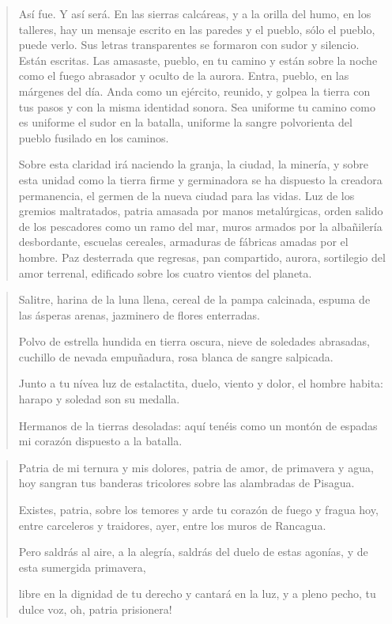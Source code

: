 \documentclass[12pt]{article}
\begin{document}
\clearpage
{}
\begin{verse}
Así fue. Y así será. En las sierras  
calcáreas, y a la orilla  
del humo, en los talleres,  
hay un mensaje escrito en las paredes  
y el pueblo, sólo el pueblo, puede verlo.  
Sus letras transparentes se formaron  
con sudor y silencio. Están escritas.  
Las amasaste, pueblo, en tu camino  
y están sobre la noche como el fuego  
abrasador y oculto de la aurora.  
Entra, pueblo, en las márgenes del día.  
Anda como un ejército, reunido,  
y golpea la tierra con tus pasos  
y con la misma identidad sonora.  
Sea uniforme tu camino como  
es uniforme el sudor en la batalla,  
uniforme la sangre polvorienta  
del pueblo fusilado en los caminos.  
	
Sobre esta claridad irá naciendo  
la granja, la ciudad, la minería,  
y sobre esta unidad como la tierra  
firme y germinadora se ha dispuesto  
la creadora permanencia, el germen  
de la nueva ciudad para las vidas.  
Luz de los gremios maltratados, patria  
amasada por manos metalúrgicas,  
orden salido de los pescadores  
como un ramo del mar, muros armados  
por la albañilería desbordante,  
escuelas cereales, armaduras  
de fábricas amadas por el hombre.  
Paz desterrada que regresas, pan  
compartido, aurora, sortilegio  
del amor terrenal, edificado  
sobre los cuatro vientos del planeta.  

\end{verse}

\clearpage
{}
\begin{verse}
Salitre, harina de la luna llena,  
cereal de la pampa calcinada,  
espuma de las ásperas arenas,  
jazminero de flores enterradas.  
	
Polvo de estrella hundida en tierra oscura,  
nieve de soledades abrasadas,  
cuchillo de nevada empuñadura,  
rosa blanca de sangre salpicada.  
	
Junto a tu nívea luz de estalactita,  
duelo, viento y dolor, el hombre habita:  
harapo y soledad son su medalla.  
	
Hermanos de la tierras desoladas:  
aquí tenéis como un montón de espadas  
mi corazón dispuesto a la batalla.  

\end{verse}

\clearpage
{}
\begin{verse}
Patria de mi ternura y mis dolores,  
patria de amor, de primavera y agua,  
hoy sangran tus banderas tricolores  
sobre las alambradas de Pisagua.  
	
Existes, patria, sobre los temores  
y arde tu corazón de fuego y fragua  
hoy, entre carceleros y traidores,  
ayer, entre los muros de Rancagua.  
	
Pero saldrás al aire, a la alegría,  
saldrás del duelo de estas agonías,  
y de esta sumergida primavera,  
	
libre en la dignidad de tu derecho  
y cantará en la luz, y a pleno pecho,  
tu dulce voz, oh, patria prisionera!  

\end{verse}
\end{document}
